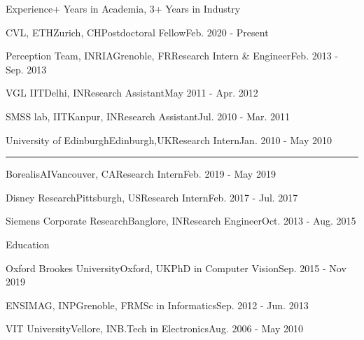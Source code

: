 \documentclass{resume} %
\begin{document}

\begin{rSection}{Experience}{+ Years in Academia, 3+ Years in Industry}
\begin{rSubsection}{CVL, ETH}{Zurich, CH}{Postdoctoral Fellow}{Feb. 2020 - Present}\end{rSubsection}
\begin{rSubsection}{Perception Team, INRIA}{Grenoble, FR}{Research Intern \& Engineer}{Feb. 2013 - Sep. 2013}\end{rSubsection}
\begin{rSubsection}{VGL IIT}{Delhi, IN}{Research Assistant}{May 2011 - Apr. 2012}\end{rSubsection}
\begin{rSubsection}{SMSS lab, IIT}{Kanpur, IN}{Research Assistant}{Jul. 2010 - Mar. 2011}\end{rSubsection}
\begin{rSubsection}{University of Edinburgh}{Edinburgh,UK}{Research Intern}{Jan. 2010 - May 2010}\end{rSubsection}
\sectionlineskip
\hrule
\begin{rSubsection}{BorealisAI}{Vancouver, CA}{Research Intern}{Feb. 2019 - May 2019}\end{rSubsection}
\begin{rSubsection}{Disney Research}{Pittsburgh, US}{Research Intern}{Feb. 2017 - Jul. 2017}\end{rSubsection}
\begin{rSubsection}{Siemens Corporate Research}{Banglore, IN}{Research Engineer}{Oct. 2013 - Aug. 2015}\end{rSubsection}

\end{rSection}

\begin{rSection}{Education}{}
\begin{eSubsection}{Oxford Brookes University}{Oxford, UK}{PhD in Computer Vision}{Sep. 2015 - Nov 2019}\end{eSubsection}
\begin{eSubsection}{ENSIMAG, INP}{Grenoble, FR}{MSc in Informatics}{Sep. 2012 - Jun. 2013}\end{eSubsection}
\begin{eSubsection}{VIT University}{Vellore, IN}{B.Tech in Electronics}{Aug. 2006 - May 2010}\end{eSubsection} 
\end{rSection}
\end{document}
